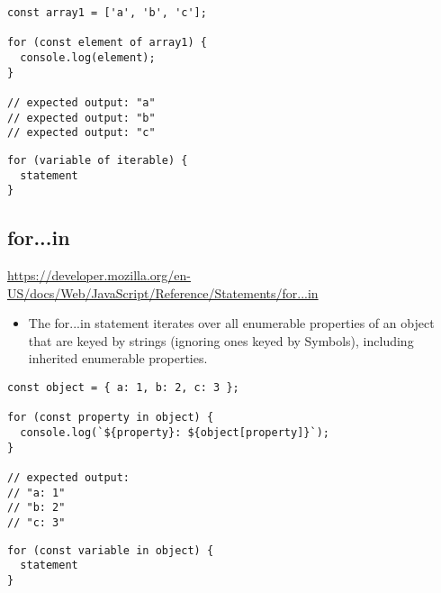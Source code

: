 \documentclass[10pt]{article}
\begin{document}
\begin{lstlisting}[title=Example for...of, captionpos=t]
const array1 = ['a', 'b', 'c'];

for (const element of array1) {
  console.log(element);
}

// expected output: "a"
// expected output: "b"
// expected output: "c"
\end{lstlisting}

\begin{lstlisting}[title=Example for...of, captionpos=t]
for (variable of iterable) {
  statement
}
\end{lstlisting}
\medskip %









\medskip %
\pagebreak
\subsection{for...in}

\url{https://developer.mozilla.org/en-US/docs/Web/JavaScript/Reference/Statements/for...in}

\begin{itemize}
	\item The for...in statement iterates over all enumerable properties of an object that are keyed by strings (ignoring ones keyed by Symbols), including inherited enumerable properties.
\end{itemize}

\begin{lstlisting}[title=Example for...in, captionpos=t]
const object = { a: 1, b: 2, c: 3 };

for (const property in object) {
  console.log(`${property}: ${object[property]}`);
}

// expected output:
// "a: 1"
// "b: 2"
// "c: 3"
\end{lstlisting}

\begin{lstlisting}[title=Example for...in, captionpos=t]
for (const variable in object) {
  statement
}
\end{lstlisting}
\medskip %
\end{document}
